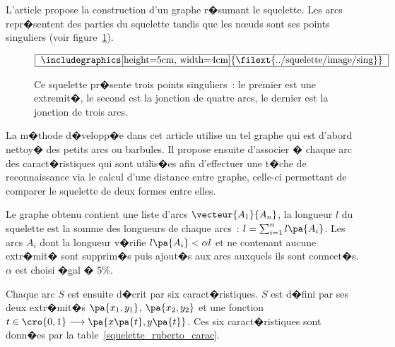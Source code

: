 L'article  propose la construction d'un graphe r�sumant le squelette. Les arcs repr�sentent des parties du squelette tandis que les n\oe uds sont ses points singuliers (voir figure~\ref{squelette_point_singuliers}).


            \begin{figure}[ht]
        $$\begin{tabular}{|c|} \hline 
        \includegraphics[height=5cm, width=4cm] {\filext{../squelette/image/sing}} 
        \\ \hline \end{tabular}$$
        \caption{    Ce squelette pr�sente trois points singuliers~: le premier est une extremit�, le second 
                            est la jonction de quatre arcs, le dernier est la jonction de trois arcs.}
        \label{squelette_point_singuliers}
            \end{figure}


La m�thode d�velopp�e dans cet article utilise un tel graphe qui est d'abord nettoy� des petits arcs ou barbules. Il propose ensuite d'associer � chaque arc des caract�ristiques qui sont utilis�es afin d'effectuer une t�che de reconnaissance via le calcul d'une distance entre graphe, celle-ci permettant de comparer le squelette de deux formes entre elles.

Le graphe obtenu contient une liste d'arcs $\vecteur{A_1}{A_n}$, la longueur $l$ du squelette est la somme des longueurs de chaque arcs~: $l = \sum_{i=1}^{n} l\pa{A_i}$. Les arcs $A_i$ dont la longueur v�rifie $l\pa{A_i} < \alpha l$ et ne contenant aucune extr�mit� sont supprim�s puis ajout�s aux arcs auxquels ils sont connect�s. $\alpha$ est choisi �gal � 5\%.

Chaque arc $S$ est ensuite d�crit par six caract�ristiques. $S$ est d�fini par ses deux extr�mit�s $\pa{x_1,y_1}$, $\pa{x_2,y_2}$ et une fonction $t \in \cro{0,1} \longrightarrow \pa{x\pa{t},y\pa{t} }$. Ces six caract�ristiques sont donn�es par la table~\ref{squelette_ruberto_carac}.


